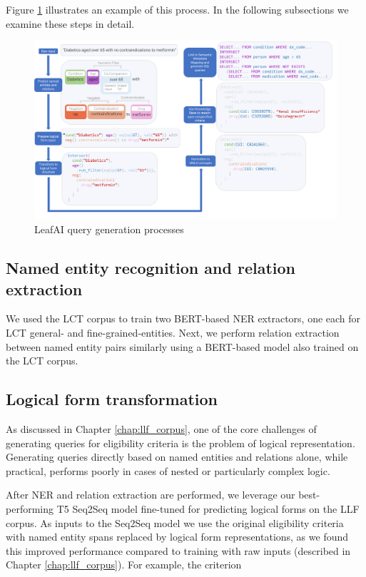\documentclass[../main.tex]{subfiles}
\begin{document}
\noindent Figure \ref{fig_leafai_querygen} illustrates an example of this process. In the following subsections we examine these steps in detail.

\begin{figure}[h]
  \includegraphics[scale=0.46]{Figures/7_query_generation/leafai_flow.pdf}  
\caption{LeafAI query generation processes}
\label{fig_leafai_querygen}
\end{figure}

\subsection{Named entity recognition and relation extraction}

\noindent We used the LCT corpus to train two BERT-based NER extractors, one each for LCT general- and fine-grained-entities. Next, we perform relation extraction between named entity pairs similarly using a BERT-based model also trained on the LCT corpus.

\subsection{Logical form transformation}

As discussed in Chapter \ref{chap:llf_corpus}, one of the core challenges of generating queries for eligibility criteria is the problem of logical representation. Generating queries directly based on named entities and relations alone, while practical, performs poorly in cases of nested or particularly complex logic.

After NER and relation extraction are performed, we leverage our best-performing T5 Seq2Seq model fine-tuned for predicting logical forms on the LLF corpus. As inputs to the Seq2Seq model we use the original eligibility criteria with named entity spans replaced by logical form representations, as we found this improved performance compared to training with raw inputs (described in Chapter \ref{chap:llf_corpus}). For example, the criterion  
\end{document}
